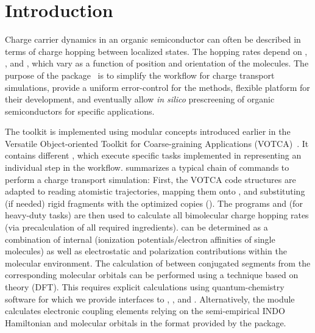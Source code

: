 \chapter{Introduction}
\label{sec:introduction}

Charge carrier dynamics in an organic semiconductor can often be described in terms of charge hopping between localized states. The hopping rates depend on , , and , which vary as a function of position and orientation of the molecules. 
The purpose of the \votcaxtp package~\cite{ruhle_microscopic_2011} is to simplify the workflow for charge transport simulations, provide a uniform error-control for the methods, flexible platform for their development, and eventually allow {\em in silico} prescreening of organic semiconductors for specific applications. 

The toolkit is implemented using modular concepts introduced earlier in the Versatile Object-oriented Toolkit for Coarse-graining Applications (VOTCA)~\cite{ruhle_versatile_2009}. It contains different , which execute specific tasks implemented in  representing an individual step in the workflow.  summarizes a typical chain of commands to perform a charge transport simulation:   
%
First, the VOTCA code structures are adap\-ted to reading atomistic trajectories, mapping them onto , and substituting (if needed) rigid fragments with the optimized copies (\xtpmap). The programs \xtprun and \xtpparallel (for heavy-duty tasks) are then used to calculate all bimolecular charge hopping rates (via precalculation of all required ingredients).  can be determined as a combination of internal (ionization potentials/electron affinities of single molecules) as well as electrostatic and polarization contributions within the molecular environment. The calculation of  between conjugated segments from the corresponding molecular orbitals can be performed using a  technique based on  theory (DFT). This requires explicit calculations using quantum-chemistry software for which we provide interfaces to \gaussian, \turbomole, and \nwchem. Alternatively, the  module calculates electronic coupling elements relying on the semi-empirical INDO Hamiltonian and molecular orbitals in the format provided by the \gaussian package. 

